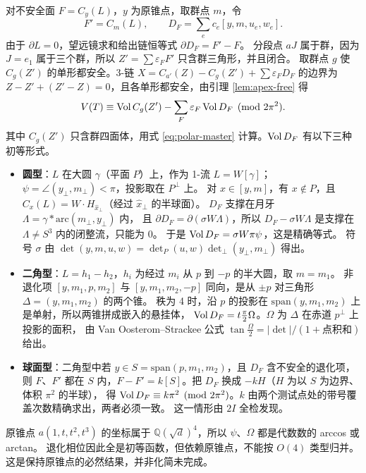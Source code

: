 对不安全面 $F=C_y(L)$，$y$ 为原锥点，取群点 $m$，令
\[
F'=C_m(L),\qquad D_F=\sum_ec_e[y,m,u_e,w_e].
\]
由于 $\partial L=0$，望远镜求和给出链恒等式 $\partial D_F=F'-F$。
分段点 $aJ$ 属于群，因为 $J=e_1$ 属于三个群，所以 $Z'=\sum\varepsilon_FF'$ 只含群三角形，并且闭合。
取群点 $g$ 使 $C_g(Z')$ 的单形都安全。3-链 $X=C_{a'}(Z)-C_g(Z')+\sum\varepsilon_FD_F$
的边界为 $Z-Z'+(Z'-Z)=0$，且各单形都安全，由引理 \ref{lem:apex-free} 得
\begin{equation}
V(T)\equiv\operatorname{Vol} C_g(Z')-\sum_F\varepsilon_F\operatorname{Vol} D_F\pmod{2\pi^2}.
\label{eq:degenerate-elementary}
\end{equation}
其中 $C_g(Z')$ 只含群四面体，用式 \eqref{eq:polar-master} 计算。$\operatorname{Vol} D_F$ 有以下三种初等形式。
\begin{itemize}
\item \textbf{圆型}：$L$ 在大圆 $\gamma$（平面 $P$）上，作为 1-流 $L=W[\gamma]$；
  $\psi=\angle(y_\perp,m_\perp)<\pi$，投影取在 $P^\perp$ 上。
  对 $x\in[y,m]$，有 $x\notin P$，且 $C_x(L)=W\cdot H_{\hat x_\perp}$（经过 $\hat x_\perp$ 的半球面）。
  $D_F$ 支撑在月牙 $\Lambda=\gamma*\mathrm{arc}(m_\perp,y_\perp)$ 内，
  且 $\partial D_F=\partial(\sigma W\Lambda)$，所以 $D_F-\sigma W\Lambda$ 是支撑在 $\Lambda\ne S^3$ 内的闭整流，只能为 0。
  于是 $\operatorname{Vol} D_F=\sigma W\pi\psi$，这是精确等式。
  符号 $\sigma$ 由 $\det(y,m,u,w)=\det_P(u,w)\det_\perp(y_\perp,m_\perp)$ 得出。
\item \textbf{二角型}：$L=h_1-h_2$，$h_i$ 为经过 $m_i$ 从 $p$ 到 $-p$ 的半大圆，取 $m=m_1$。
  非退化项 $[y,m_1,p,m_2]$ 与 $[y,m_1,m_2,-p]$ 同向，是从 $\pm p$ 对三角形 $\Delta=(y,m_1,m_2)$ 的两个锥。
  秩为 4 时，沿 $p$ 的投影在 $\mathrm{span}(y,m_1,m_2)$ 上是单射，所以两锥拼成嵌入的悬挂体，
  $\operatorname{Vol} D_F=t\frac\pi2\Omega$。$\Omega$ 为 $\Delta$ 在赤道 $p^\perp$ 上投影的面积，
  由 Van Oosterom--Strackee 公式 $\tan\frac\Omega2=|\det|/(1+\text{点积和})$ 给出。
\item \textbf{球面型}：二角型中若 $y\in S=\mathrm{span}(p,m_1,m_2)$，且 $D_F$ 含不安全的退化项，
  则 $F$、$F'$ 都在 $S$ 内，$F-F'=k[S]$。把 $D_F$ 换成 $-kH$（$H$ 为以 $S$ 为边界、体积 $\pi^2$ 的半球），
  得 $\operatorname{Vol} D_F\equiv k\pi^2\pmod{2\pi^2}$。$k$ 由两个测试点处的带号覆盖次数精确求出，两者必须一致。
  这一情形由 $2I$ 全检发现。
\end{itemize}
原锥点 $a(1,t,t^2,t^3)$ 的坐标属于 $\mathbb Q(\sqrt d)^4$，所以 $\psi$、$\Omega$ 都是代数数的 arccos 或 arctan。
退化相位因此全是初等函数，但依赖原锥点，不能按 $O(4)$ 类型归并。
这是保持原锥点的必然结果，并非化简未完成。

